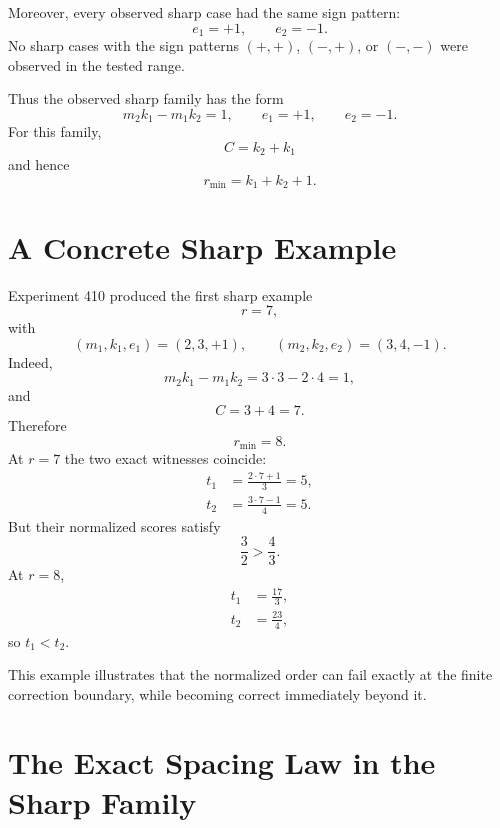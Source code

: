\documentclass[11pt,a4paper]{article}
\begin{document}
Moreover, every observed sharp case had the same sign pattern:
\begin{equation}
    \boxed{
    e_1=+1,
    \qquad
    e_2=-1.
    }
\end{equation}
No sharp cases with the sign patterns $(+,+)$, $(-,+)$, or $(-,-)$ were observed in the tested range.

Thus the observed sharp family has the form
\begin{equation}
    \boxed{
    m_2k_1-m_1k_2=1,
    \qquad
    e_1=+1,
    \qquad
    e_2=-1.
    }
\end{equation}
For this family,
\begin{equation}
    C=k_2+k_1
\end{equation}
and hence
\begin{equation}
    r_{\min}=k_1+k_2+1.
\end{equation}

\section{A Concrete Sharp Example}

Experiment 410 produced the first sharp example
\[
    r=7,
\]
with
\[
    (m_1,k_1,e_1)=(2,3,+1),
    \qquad
    (m_2,k_2,e_2)=(3,4,-1).
\]
Indeed,
\begin{equation}
    m_2k_1-m_1k_2
    =3\cdot3-2\cdot4
    =1,
\end{equation}
and
\begin{equation}
    C=3+4=7.
\end{equation}
Therefore
\[
    r_{\min}=8.
\]
At $r=7$ the two exact witnesses coincide:
\begin{align*}
    t_1&=\frac{2\cdot7+1}{3}=5,\\
    t_2&=\frac{3\cdot7-1}{4}=5.
\end{align*}
But their normalized scores satisfy
\[
    \frac32>\frac43.
\]
At $r=8$,
\begin{align*}
    t_1&=\frac{17}{3},\\
    t_2&=\frac{23}{4},
\end{align*}
so $t_1<t_2$.

This example illustrates that the normalized order can fail exactly at the finite correction boundary, while becoming correct immediately beyond it.

\section{The Exact Spacing Law in the Sharp Family}
\end{document}
